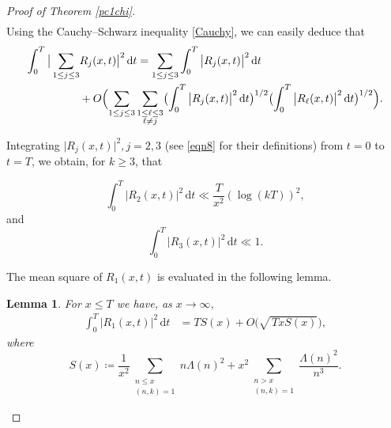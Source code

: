 \documentclass[pdflatex]{sn-jnl}%
\newcommand{\dx}{\mathrm{d}}
\theoremstyle{sltheorems}
\newtheorem{lem}{Lemma}
\theoremstyle{plainrem}
\theoremstyle{definition}
\begin{document}
\begin{proof}[Proof of Theorem \ref{pc1chi}]
\begin{align}
   \end{align}
Using the Cauchy--Schwarz inequality \eqref{Cauchy}, we can easily deduce that
\begin{align}\label{eqn39}
  \int_{0}^T \big \vert \sum_{1\le  j \le  3} & R_j(x,t)\big \vert ^2 \, \dx t 
  =   \sum_{1\le  j\le  3} \int_{0}^T \big \vert  R_j(x,t)\big \vert ^2 \, \dx t   \nonumber \\
  & + O\Bigl(\sum_{1\le  j \le  3} \sum_{\substack{1\le  \ell \le  3\\ \ell\ne j}} 
  \bigl(\int_{0}^T \big \vert  R_j(x,t)\big \vert ^2 \, \dx t\bigr)^{1/2} 
  \bigl(\int_{0}^T \big \vert  R_\ell(x,t)\big \vert ^2 \, \dx t\bigr)^{1/2}
  \Bigr).
\end{align}

Integrating   $\vert R_j(x,t) \vert^2, j = 2,3$ (see \eqref{eqn8} for 
their definitions) from $t=0$ to $t=T$, we 
obtain, for $k \ge  3$, that

\begin{equation}\label{eqn411}
    \int_{0}^T  \vert R_2(x,t) \vert ^2 \, \dx t \ll
    \frac{ T }{x^2} (\log (kT))^2,
\end{equation}
and 
\begin{equation}\label{eqn40}
   \int_{0}^T  \vert R_3(x,t) \vert ^2 \, \dx t  \ll 1.
\end{equation}

The mean square of  $R_1(x,t)$ is evaluated in the following lemma.
\begin{lem}
\label{GM-lemma}
For $ x \le T$ we have, as $x \to \infty$,
\begin{align}
\label{sx11}
   \int_{0}^T  \vert R_1(x,t) \vert ^2 \, \dx t  &=
  T S(x) + O\bigl(\sqrt{\, TxS(x)}\bigr),
   \end{align}
where
\begin{equation}
\label{Sdef}
 S(x) \coloneq \frac{1}{x^2}
\sum_{\substack{n \le x \\ (n,k)=1}} n \Lambda(n)^2 +
x^2 \sum_{\substack{n > x \\ (n,k)=1 }}\frac{\Lambda(n)^2}{n^3}.
\end{equation}
\end{lem}



\end{proof}
\end{document}
